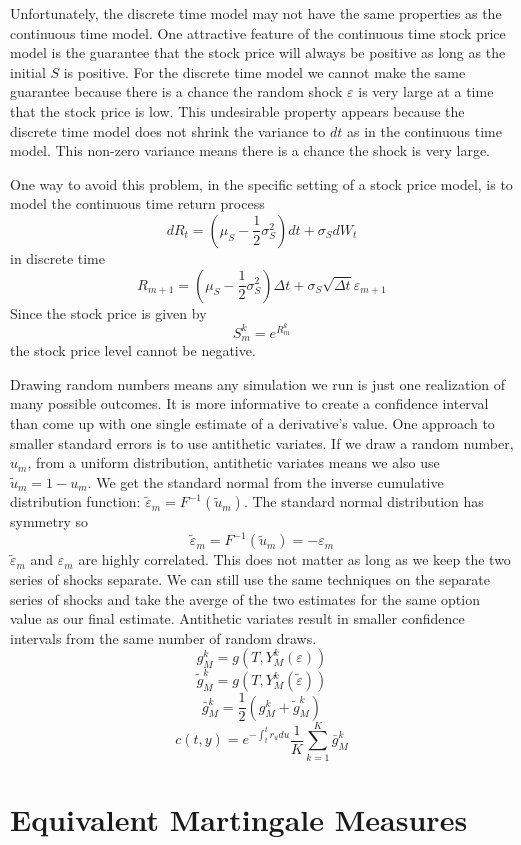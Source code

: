 \documentclass[12pt]{article}
\begin{document}
Unfortunately, the discrete time model may not have the same properties as the
continuous time model. One attractive feature of the continuous time stock
price model is the guarantee that the stock price will always be positive as
long as the initial $S$ is positive. For the discrete time model we cannot make
the same guarantee because there is a chance the random shock $\varepsilon$ is
very large at a time that the stock price is low. This undesirable property
appears because the discrete time model does not shrink the variance to $dt$
as in the continuous time model. This non-zero variance means there is a chance
the shock is very large.

One way to avoid this problem, in the specific setting of a stock price model,
is to model the continuous time return process
$$dR_t=(\mu_S-\frac{1}{2}\sigma_S^2)dt+\sigma_SdW_t$$
in discrete time
$$R_{m+1}=(\mu_S-\frac{1}{2}\sigma_S^2)\Delta t
+\sigma_S\sqrt{\Delta t}\varepsilon_{m+1}$$
Since the stock price is given by
$$S_m^k=e^{R_m^k}$$
the stock price level cannot be negative.

Drawing random numbers means any simulation we run is just one realization of
many possible outcomes. It is more informative to create a confidence interval
than come up with one single estimate of a derivative's value. One approach to
smaller standard errors is to use antithetic variates. If we draw a random
number, $u_m$, from a uniform distribution, antithetic variates means we also
use $\tilde{u}_m=1-u_m$. We get the standard normal from the inverse cumulative
distribution function: $\tilde{\varepsilon}_m=F^{-1}(\tilde{u}_m)$. The
standard normal distribution has symmetry so
$$\tilde{\varepsilon}_m=F^{-1}(\tilde{u}_m)=-\varepsilon_m$$
$\tilde{\varepsilon}_m$ and $\varepsilon_m$ are highly correlated. This does
not matter as long as we keep the two series of shocks separate. We can still
use the same techniques on the separate series of shocks and take the averge of
the two estimates for the same option value as our final estimate. Antithetic
variates result in smaller confidence intervals from the same number of random
draws.
$$g_M^k=g(T,Y_M^k(\varepsilon))$$
$$\tilde{g}_M^k=g(T,Y_M^k(\tilde{\varepsilon}))$$
$$\bar{g}_M^k=\frac{1}{2}(g_M^k+\tilde{g}_M^k)$$
$$c(t,y)=e^{-\int_t^tr_udu}\frac{1}{K}\sum_{k=1}^K\bar{g}_M^k$$

\pagebreak

\section{Equivalent Martingale Measures}
\end{document}
